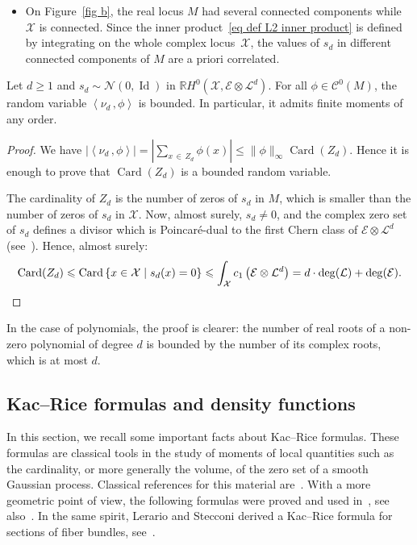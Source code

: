 \documentclass[AHL,Unicode,longabstracts,published]{cedram}
\DeclareMathOperator{\card}{Card}
\DeclareMathOperator{\Id}{Id}
\newcommand{\E}{\mathcal{E}}
\newcommand{\X}{\mathcal{X}}
\renewcommand{\L}{\mathcal{L}}
\newcommand{\clN}{\mathcal{N}}
\newcommand{\clC}{\mathcal{C}}
\newcommand{\R}{\mathbb{R}}
\newcommand{\mvert}{\mathrel{}\middle|\mathrel{}}
\newcommand{\prsc}[2]{\left\langle #1\,, #2 \right\rangle}
\renewcommand{\H}{H^0(\X,\E \otimes \L^d)}
\renewcommand{\geq}{\geqslant}
\renewcommand{\leq}{\leqslant}
\begin{document}
\begin{exam}
\begin{itemize}
\item On Figure~\ref{fig b}, the real locus $M$ had several connected components while $\X$ is connected. Since the inner product~\eqref{eq def L2 inner product} is defined by integrating on the whole complex locus~$\X$, the values of $s_d$ in different connected components of $M$ are a priori correlated.
\end{itemize}
\end{exam}

\begin{lemm}\label{lem L inf random variables}
Let $d \geq 1$ and $s_d \sim \clN(0,\Id)$ in $\R\H$. For all $\phi \in \clC^0(M)$, the random variable $\prsc{\nu_d}{\phi}$ is bounded. In particular, it admits finite moments of any order.
\end{lemm}

\begin{proof}
We have $|\prsc{\nu_d}{\phi}| = |\sum_{x\,\in\,Z_d}\phi(x)| \leq \|\phi\|_\infty \card(Z_d)$. Hence it is enough to prove that $\card(Z_d)$ is a bounded random variable.

The cardinality of $Z_d$ is the number of zeros of $s_d$ in $M$, which is smaller than the number of zeros of $s_d$ in $\X$. Now, almost surely, $s_d \neq 0$, and the complex zero set of $s_d$ defines a divisor which is Poincaré-dual to the first Chern class of $\E \otimes \L^d$ (see~\cite[pp.~136 and~141]{GH1994}). Hence, almost surely:
\[
\card(Z_d) \leq \card \left\{ x \in \X \mvert s_d(x)=0 \right\} \leq \int_\X c_1\left(\E \otimes \L^d\right)=d\cdot\deg(\L)+\deg(\E).\qedhere
\]
\end{proof}

\begin{rema}\label{rem roots}
In the case of polynomials, the proof is clearer: the number of real roots of a non-zero polynomial of degree $d$ is bounded by the number of its complex roots, which is at most $d$.
\end{rema}



\subsection{Kac--Rice formulas and density functions}\label{subsec Kac-Rice formulas and density functions}

In this section, we recall some important facts about Kac--Rice formulas. These formulas are classical tools in the study of moments of local quantities such as the cardinality, or more generally the volume, of the zero set of a smooth Gaussian process. Classical references for this material are~\cite{AT2007,AW2009}. With a more geometric point of view, the following formulas were proved and used in~\cite{Anc2019,GW2016,LP2019}, see also~\cite{Let2016}. In the same spirit, Lerario and Stecconi derived a Kac--Rice formula for sections of fiber bundles, see~\cite[Theorem~23, point~6]{LS2019a}.
\end{document}

